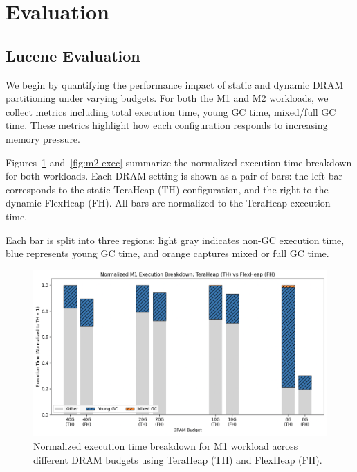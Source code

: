 \section{Evaluation}

\subsection{Lucene Evaluation}

We begin by quantifying the performance impact of static and dynamic DRAM partitioning under varying budgets. 
For both the M1 and M2 workloads, we collect metrics including total execution time, 
young GC time, mixed/full GC time. These metrics highlight how each configuration 
responds to increasing memory pressure.

Figures~\ref{fig:m1-exec} and~\ref{fig:m2-exec} summarize the normalized execution time breakdown for both workloads.
Each DRAM setting is shown as a pair of bars: the left bar corresponds to the static TeraHeap (TH) configuration, 
and the right to the dynamic FlexHeap (FH). All bars are normalized to the TeraHeap execution time. 

Each bar is split into three regions: 
light gray indicates non-GC execution time, 
blue represents young GC time, 
and orange captures mixed or full GC time.


\begin{figure}[htbp]
  \centering
  \includegraphics[width=0.95\linewidth]{fig/M1_exec.png}
  \caption{Normalized execution time breakdown for M1 workload across different DRAM budgets using TeraHeap (TH) and FlexHeap (FH).}
  \label{fig:m1-exec}
\end{figure}

